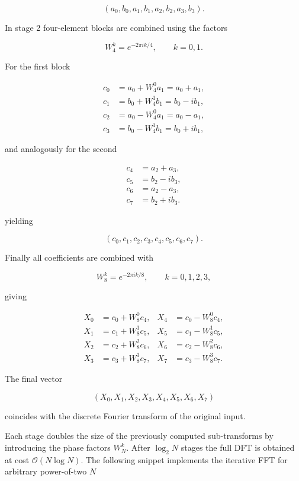 \documentclass[11pt,a4paper,twoside,pdf]{article}
\numberwithin{equation}{section}
\begin{document}
\[
(a_0,b_0,a_1,b_1,a_2,b_2,a_3,b_3).
\]

In stage 2 four-element blocks are combined using the factors

\[
W_4^k = e^{-2\pi i k/4}, \qquad k=0,1.
\]

For the first block

\[
\begin{aligned}
c_0 &= a_0 + W_4^0 a_1 = a_0 + a_1,\\
c_1 &= b_0 + W_4^1 b_1 = b_0 - i b_1,\\
c_2 &= a_0 - W_4^0 a_1 = a_0 - a_1,\\
c_3 &= b_0 - W_4^1 b_1 = b_0 + i b_1,
\end{aligned}
\]

and analogously for the second

\[
\begin{aligned}
c_4 &= a_2 + a_3,\\
c_5 &= b_2 - i b_3,\\
c_6 &= a_2 - a_3,\\
c_7 &= b_2 + i b_3.
\end{aligned}
\]

yielding

\[
(c_0,c_1,c_2,c_3,c_4,c_5,c_6,c_7).
\]


Finally all coefficients are combined with

\[
W_8^k = e^{-2\pi i k/8}, \qquad k=0,1,2,3,
\]

giving

\[
\begin{aligned}
X_0 &= c_0 + W_8^0 c_4, &
X_4 &= c_0 - W_8^0 c_4,\\
X_1 &= c_1 + W_8^1 c_5, &
X_5 &= c_1 - W_8^1 c_5,\\
X_2 &= c_2 + W_8^2 c_6, &
X_6 &= c_2 - W_8^2 c_6,\\
X_3 &= c_3 + W_8^3 c_7, &
X_7 &= c_3 - W_8^3 c_7.
\end{aligned}
\]

The final vector

\[
(X_0,X_1,X_2,X_3,X_4,X_5,X_6,X_7)
\]

coincides with the discrete Fourier transform of the original input.


Each stage doubles the size of the previously computed sub-transforms by introducing the phase factors $W_N^k$. After $\log_2 N$ stages the full DFT is obtained at cost $\mathcal{O}(N\log N)$. The following snippet implements the iterative FFT for arbitrary power-of-two $N$\\
\end{document}
